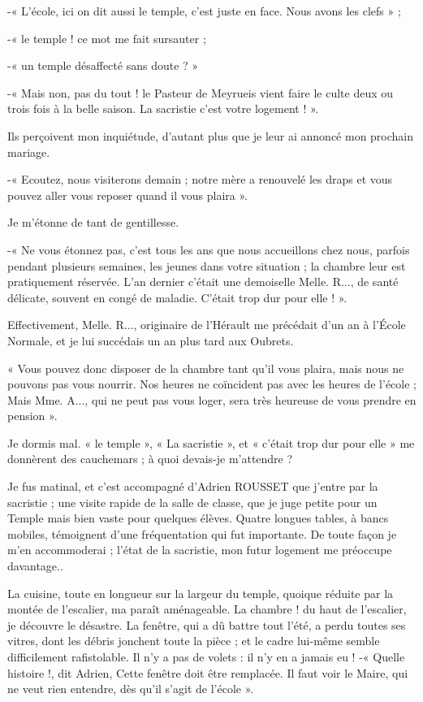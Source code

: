 -« L'école, ici on dit aussi le temple, c'est juste en face. Nous avons les clefs » ;

-« le temple ! ce mot me fait sursauter ;

-« un temple désaffecté sans doute ? »

-« Mais non, pas du tout ! le Pasteur de Meyrueis vient faire le culte deux ou trois
fois à la belle saison. La sacristie c'est votre logement ! ».

Ils perçoivent mon inquiétude, d'autant plus que je leur ai annoncé mon prochain
mariage.

-« Ecoutez, nous visiterons demain ; notre mère a renouvelé les draps et vous
pouvez aller vous reposer quand il vous plaira ».

Je m'étonne de tant de gentillesse.

-« Ne vous étonnez pas, c'est tous les ans que nous accueillons chez nous, parfois
pendant plusieurs semaines, les jeunes dans votre situation ; la chambre leur est
pratiquement réservée. L'an dernier c'était une demoiselle Melle. R..., de santé
délicate, souvent en congé de maladie. C'était trop dur pour elle ! ».

Effectivement, Melle. R..., originaire de l'Hérault me précédait d'un an à l'École
Normale, et je lui succédais un an plus tard aux Oubrets.

« Vous pouvez donc disposer de la chambre tant qu'il vous plaira, mais nous ne
pouvons pas vous nourrir. Nos heures ne coïncident pas avec les heures de l'école ;
Mais Mme. A..., qui ne peut pas vous loger, sera très heureuse de vous prendre en
pension ».


Je dormis mal. « le temple », « La sacristie », et « c’était trop dur pour elle » me
donnèrent des cauchemars ; à quoi devais-je m’attendre ?

Je fus matinal, et c’est accompagné d’Adrien ROUSSET que j’entre par la sacristie ;
une visite rapide de la salle de classe, que je juge petite pour un Temple mais bien
vaste pour quelques élèves. Quatre longues tables, à bancs mobiles, témoignent d’une
fréquentation qui fut importante. De toute façon je m’en accommoderai ; l’état de la
sacristie, mon futur logement me préoccupe davantage..

La cuisine, toute en longueur sur la largeur du temple, quoique réduite par la montée
de l’escalier, ma paraît aménageable. La chambre ! du haut de l’escalier, je découvre
le désastre. La fenêtre, qui a dû battre tout l’été, a perdu toutes ses vitres, dont les
débris jonchent toute la pièce ; et le cadre lui-même semble difficilement rafistolable.
Il n’y a pas de volets : il n’y en a jamais eu !
-« Quelle histoire !, dit Adrien, Cette fenêtre doit être remplacée. Il faut voir le
Maire, qui ne veut rien entendre, dès qu’il s’agit de l’école ».

